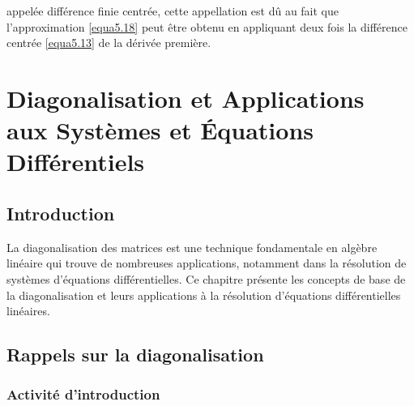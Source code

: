 appelée différence finie centrée, cette appellation est dû au fait que l'approximation \eqref{equa5.18} peut être obtenu en appliquant deux fois la différence centrée \eqref{equa5.13} de la dérivée première.

\chapter{{\LARGE \textbf{Diagonalisation et Applications}}\\[4pt]
	{\Large \textbf{aux Systèmes et Équations Différentiels}}}

\section{Introduction}

La diagonalisation des matrices est une technique fondamentale en algèbre linéaire qui trouve de nombreuses applications, notamment dans la résolution de systèmes d'équations différentielles. Ce chapitre présente les concepts de base de la diagonalisation et leurs applications à la résolution d'équations différentielles linéaires.

\section{Rappels sur la diagonalisation}

\subsection{Activité d'introduction}

